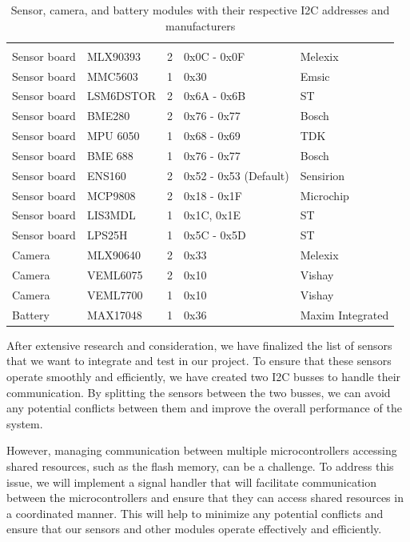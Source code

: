 \documentclass[11pt]{article}
\begin{document}
\begin{table}[htbp]
\centering
{} %
\begin{tabular}{>{\centering\arraybackslash}m{3cm}>{\centering\arraybackslash}llll}
\hline
\rowcolor{DeepSkyBlue4}
\textbf{\color{white!50}{Module}} & \textbf{\color{white}{Sensor}} & \textbf{\color{white}{I2C Bus}} & \textbf{\color{white}{I2C Address}} & \textbf{\color{white}{Manufacturer}} \\
Sensor board & MLX90393 & 2 & 0x0C - 0x0F & Melexix \\
Sensor board & MMC5603 & 1 & 0x30 & Emsic \\
Sensor board & LSM6DSTOR & 2 & 0x6A - 0x6B & ST \\
Sensor board & BME280 & 2 & 0x76 - 0x77 & Bosch \\
Sensor board & MPU 6050 & 1 & 0x68 - 0x69 & TDK \\
Sensor board & BME 688 & 1 & 0x76 - 0x77 & Bosch \\
Sensor board & ENS160 & 2 & 0x52 - 0x53 (Default) & Sensirion \\
Sensor board & MCP9808 & 2 & 0x18 - 0x1F & Microchip \\
Sensor board & LIS3MDL & 1 & 0x1C, 0x1E & ST \\
Sensor board & LPS25H & 1 & 0x5C - 0x5D & ST \\
Camera & MLX90640 & 2 & 0x33 & Melexix \\
Camera & VEML6075 & 2 & 0x10 & Vishay \\
Camera & VEML7700 & 1 & 0x10 & Vishay \\
Battery & MAX17048 & 1 & 0x36 & Maxim Integrated \\
\end{tabular}
\caption{Sensor, camera, and battery modules with their respective I2C addresses and manufacturers}
\label{tab:sensors}
\end{table}

After extensive research and consideration, we have finalized the list of sensors that we want to integrate and test in our project. To ensure that these sensors operate smoothly and efficiently, we have created two I2C busses to handle their communication. By splitting the sensors between the two busses, we can avoid any potential conflicts between them and improve the overall performance of the system.

However, managing communication between multiple microcontrollers accessing shared resources, such as the flash memory, can be a challenge. To address this issue, we will implement a signal handler that will facilitate communication between the microcontrollers and ensure that they can access shared resources in a coordinated manner. This will help to minimize any potential conflicts and ensure that our sensors and other modules operate effectively and efficiently.
\end{document}
